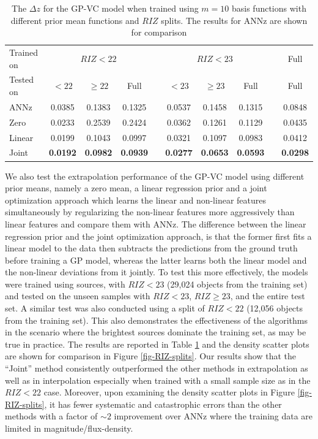 \documentclass[useAMS,usenatbib,fleqn]{mn2e}
\begin{document}
 \begin{table}
\caption{The $\Delta z$ for the GP-VC model when trained using $m=10$ basis functions with different prior mean functions and $RIZ$ splits. The results for {\sc ANNz} are shown for comparison}
\begin{center}
  \begin{tabular}{| l | c | c | c | c | c | c | c | c | c |}
  	Trained on				& 	\multicolumn{3}{|c|}{ $RIZ<22$}				&	& 	\multicolumn{3}{c}{$RIZ<23$}  &  & Full\\ \cline{2-4} \cline{6-8} \cline{10-10} 
     	Tested on					&	$<22$			&	$\ge 22$		&	Full				&	&	$<23$	&	$\ge 23$	&	Full	& & Full\\	\hline
	{\sc ANNz}						&	0.0385			&	0.1383			&	0.1325			&	&	0.0537&	0.1458	&	0.1315 &  & 0.0848				\\
	Zero						&	0.0233			&	0.2539			&	0.2424			&	&	0.0362&	0.1261	&	0.1129 &  & 0.0435				\\
	Linear						&	0.0199			&	0.1043			&	0.0997			&	&	0.0321	&	0.1097	&	0.0983 &  & 0.0412				\\
	Joint						&	\textbf{0.0192}	&	\textbf{0.0982}	&	\textbf{0.0939}	&	&	\textbf{0.0277}	&	\textbf{0.0653}	&	\textbf{0.0593} &  & \textbf{0.0298}	\\	\hline
  \end{tabular}
\end{center}
\label{table-RIZ-splits}
\end{table}

We also test the extrapolation performance of the GP-VC model using different prior means, namely a zero mean, a linear regression prior and a joint optimization approach which learns the linear and non-linear features simultaneously by regularizing the non-linear features more aggressively than linear features and compare them with {\sc ANNz}. The difference between the linear regression prior and the joint optimization approach, is that the former first fits a linear model to the data then subtracts the predictions from the ground truth before training a GP model, whereas the latter learns both the linear model and the non-linear deviations from it jointly. To test this more effectively,  the models were trained using sources, with $RIZ<23$ (29,024 objects from the training set) and tested on the unseen samples with $RIZ<23$, $RIZ\ge23$, and the entire test set. A similar test was also conducted using a split of $RIZ<22$ (12,056 objects  from the training set). This also demonstrates the effectiveness of the algorithms in the scenario where the brightest sources dominate the training set, as may be true in practice. The results are reported in Table \ref{table-RIZ-splits} and the density scatter plots are shown for comparison in Figure \ref{fig-RIZ-splits}. Our results show that the ``Joint'' method consistently outperformed the other methods in extrapolation as well as in interpolation especially when trained with a small sample size as in the $RIZ<22$ case. Moreover, upon examining the density scatter plots in Figure \ref{fig-RIZ-splits}, it has fewer systematic and catastrophic errors than the other methods with a factor of $\sim 2$ improvement over {\sc ANNz} where the training data are limited in magnitude/flux-density.
\end{document}
